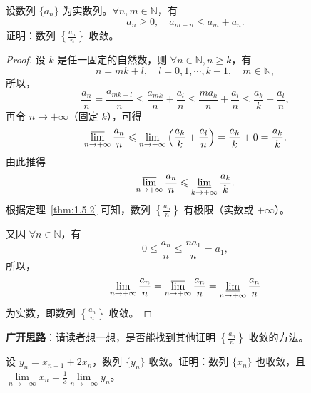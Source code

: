 \begin{example}\label{ex:1.5.3}
设数列 $\{a_n\}$ 为实数列。$\forall n, m \in \mathbb{N}$，有
\[
a_n \geqslant 0,\quad a_{m+n} \leqslant a_m + a_n.
\]
证明：数列 $\left\{\frac{a_n}{n}\right\}$ 收敛。
\end{example}

\begin{proof}
设 $k$ 是任一固定的自然数，则 $\forall n \in \mathbb{N}, n \geqslant k$，有
\[
n = mk + l,\quad l = 0, 1, \cdots, k-1,\quad m \in \mathbb{N},
\]
所以，
\[
\frac{a_n}{n} = \frac{a_{mk+l}}{n} \leqslant \frac{a_{mk}}{n} + \frac{a_l}{n} \leqslant \frac{m a_k}{n} + \frac{a_l}{n} \leqslant \frac{a_k}{k} + \frac{a_l}{n},
\]
再令 $n \to +\infty$（固定 $k$），可得
\[
\varlimsup_{n\to+\infty} \frac{a_n}{n} \leqslant \lim_{n\to+\infty} \left(\frac{a_k}{k} + \frac{a_l}{n}\right) = \frac{a_k}{k} + 0 = \frac{a_k}{k}.
\]
由此推得
\[
\varlimsup_{n\to+\infty} \frac{a_n}{n} \leqslant \varliminf_{k\to+\infty} \frac{a_k}{k}.
\]
根据定理~\ref{thm:1.5.2} 可知，数列 $\left\{\frac{a_n}{n}\right\}$ 有极限（实数或 $+\infty$）。

又因 $\forall n \in \mathbb{N}$，有
\[
0 \leqslant \frac{a_n}{n} \leqslant \frac{n a_1}{n} = a_1,
\]
所以，
\[
\lim_{n\to+\infty} \frac{a_n}{n} = \varlimsup_{n\to+\infty} \frac{a_n}{n} = \varliminf_{n\to+\infty} \frac{a_n}{n}
\]
为实数，即数列 $\left\{\frac{a_n}{n}\right\}$ 收敛。
\end{proof}

\textbf{广开思路}：请读者想一想，是否能找到其他证明 $\left\{\frac{a_n}{n}\right\}$ 收敛的方法。

\begin{example}\label{ex:1.5.4}
设 $y_n = x_{n-1} + 2x_n$，数列 $\{y_n\}$ 收敛。证明：数列 $\{x_n\}$ 也收敛，且 $\lim\limits_{n\to+\infty} x_n = \frac{1}{3}\lim\limits_{n\to+\infty} y_n$。
\end{example}

